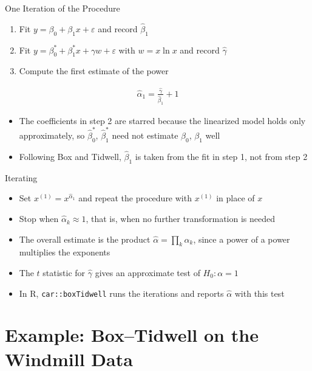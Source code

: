 \begin{frame}{One Iteration of the Procedure}
\begin{enumerate}
    \item Fit $y = \beta_0 + \beta_1 x + \varepsilon$ and record $\hat{\beta}_1$
    \item Fit $y = \beta_0^* + \beta_1^* x + \gamma w + \varepsilon$ with $w = x \ln x$ and record $\hat{\gamma}$
    \item Compute the first estimate of the power
\end{enumerate}
\begin{align*}
    \hat{\alpha}_1 = \frac{\hat{\gamma}}{\hat{\beta}_1} + 1
\end{align*}
\begin{itemize}
    \item The coefficients in step 2 are starred because the linearized model holds only approximately, so $\hat{\beta}_0^*$, $\hat{\beta}_1^*$ need not estimate $\beta_0$, $\beta_1$ well
    \item Following Box and Tidwell, $\hat{\beta}_1$ is taken from the fit in step 1, not from step 2
\end{itemize}
\end{frame}


\begin{frame}{Iterating}
\begin{itemize}
    \item Set $x^{(1)} = x^{\hat{\alpha}_1}$ and repeat the procedure with $x^{(1)}$ in place of $x$
    \item Stop when $\hat{\alpha}_k \approx 1$, that is, when no further transformation is needed
    \item The overall estimate is the product $\hat{\alpha} = \prod_k \hat{\alpha}_k$, since a power of a power multiplies the exponents
    \item The $t$ statistic for $\hat{\gamma}$ gives an approximate test of $H_0\colon \alpha = 1$
    \item In R, \texttt{car::boxTidwell} runs the iterations and reports $\hat{\alpha}$ with this test
\end{itemize}
\end{frame}



\section{Example: Box--Tidwell on the Windmill Data}


